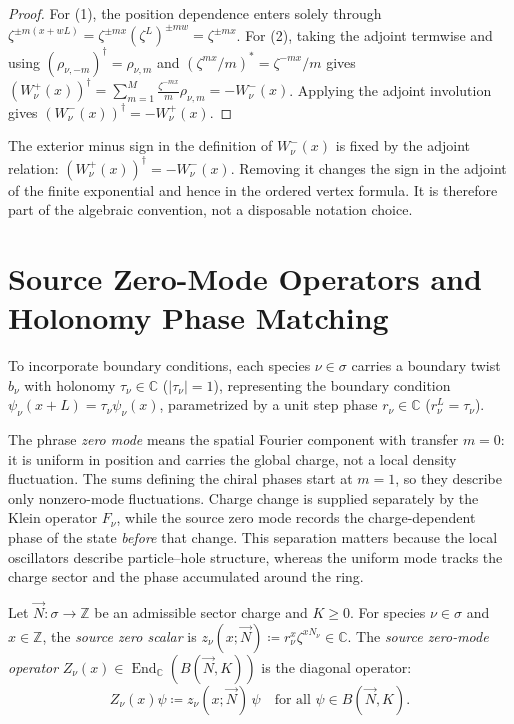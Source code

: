 \begin{proof}
For (1), the position dependence enters solely through $\zeta^{\pm m(x + w L)} = \zeta^{\pm m x} (\zeta^L)^{\pm m w} = \zeta^{\pm m x}$.
For (2), taking the adjoint termwise and using $(\rho_{\nu,-m})^\dagger=\rho_{\nu,m}$ and $(\zeta^{mx}/m)^*=\zeta^{-mx}/m$ gives $(W^+_\nu(x))^\dagger=\sum_{m=1}^M\frac{\zeta^{-mx}}{m}\rho_{\nu,m}=-W^-_\nu(x)$.
Applying the adjoint involution gives $(W^-_\nu(x))^\dagger = -W^+_\nu(x)$.
\end{proof}

\begin{remark}
The exterior minus sign in the definition of $W^-_\nu(x)$ is fixed by the adjoint relation: $(W^+_\nu(x))^\dagger=-W^-_\nu(x)$. Removing it changes the sign in the adjoint of the finite exponential and hence in the ordered vertex formula. It is therefore part of the algebraic convention, not a disposable notation choice.
\end{remark}

\section{Source Zero-Mode Operators and Holonomy Phase Matching}

To incorporate boundary conditions, each species $\nu \in \sigma$ carries a boundary twist $b_\nu$ with holonomy $\tau_\nu \in \mathbb{C}$ ($|\tau_\nu| = 1$), representing the boundary condition $\psi_\nu(x + L) = \tau_\nu \psi_\nu(x)$, parametrized by a unit step phase $r_\nu \in \mathbb{C}$ ($r_\nu^L = \tau_\nu$).

The phrase \emph{zero mode} means the spatial Fourier component with
transfer $m=0$: it is uniform in position and carries the global charge,
not a local density fluctuation. The sums defining the chiral phases start
at $m=1$, so they describe only nonzero-mode fluctuations. Charge change is
supplied separately by the Klein operator $F_\nu$, while the source zero
mode records the charge-dependent phase of the state \emph{before} that
change. This separation matters because the local oscillators describe
particle--hole structure, whereas the uniform mode tracks the charge
sector and the phase accumulated around the ring.

\begin{definition}
\label{def:zero_mode}
Let $\vec{N} : \sigma \to \mathbb{Z}$ be an admissible sector charge and $K \ge 0$. For species $\nu \in \sigma$ and $x \in \mathbb{Z}$, the \emph{source zero scalar} is $z_\nu(x; \vec{N}) \coloneqq r_\nu^x \zeta^{x N_\nu} \in \mathbb{C}$.
The \emph{source zero-mode operator} $Z_\nu(x) \in \operatorname{End}_{\mathbb{C}}(B(\vec{N}, K))$ is the diagonal operator:
\begin{equation}
Z_\nu(x) \psi \coloneqq z_\nu(x; \vec{N})\, \psi \quad \text{for all } \psi \in B(\vec{N}, K).
\end{equation}
\end{definition}

